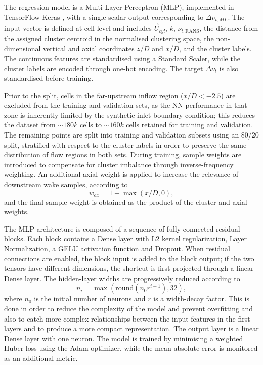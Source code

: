 The regression model is a Multi-Layer Perceptron (MLP), implemented in TensorFlow-Keras \cite{tensorflow2015-whitepaper}, with a single scalar output corresponding to $\Delta \nu_{t,ML}$. The input vector is defined at cell level and includes $\vec{U}_{cyl}$, $k$, $\nu_{t,\mathrm{RANS}}$, the distance from the assigned cluster centroid in the normalised clustering space, the non-dimensional vertical and axial coordinates $z/D$ and $x/D$, and the cluster labels. The continuous features are standardised using a Standard Scaler, while the cluster labels are encoded through one-hot encoding. The target $\Delta \nu_t$ is also standardised before training.

Prior to the split, cells in the far-upstream inflow region ($x/D < -2.5$) are excluded from the training and validation sets, as the NN performance in that zone is inherently limited by the synthetic inlet boundary condition; this reduces the dataset from $\sim 180k$ cells to $\sim 160k$ cells retained for training and validation. The remaining points are split into training and validation subsets using an 80/20 split, stratified with respect to the cluster labels in order to preserve the same distribution of flow regions in both sets. During training, sample weights are introduced to compensate for cluster imbalance through inverse-frequency weighting. An additional axial weight is applied to increase the relevance of downstream wake samples, according to
\begin{equation}
    w_{ax} = 1 + \max(x/D,0),
\end{equation}
and the final sample weight is obtained as the product of the cluster and axial weights.

The MLP architecture is composed of a sequence of fully connected residual blocks. Each block contains a Dense layer with L2 kernel regularization, Layer Normalization, a GELU activation function and Dropout. When residual connections are enabled, the block input is added to the block output; if the two tensors have different dimensions, the shortcut is first projected through a linear Dense layer. The hidden-layer widths are progressively reduced according to
\begin{equation}
    n_i = \max \left( \mathrm{round}(n_0 r^{i-1}), 32 \right),
\end{equation}
where $n_0$ is the initial number of neurons and $r$ is a width-decay factor. This is done in order to reduce the complexity of the model and prevent overfitting and also to catch more complex relationships between the input features in the first layers and to produce a more compact representation. The output layer is a linear Dense layer with one neuron. The model is trained by minimising a weighted Huber loss using the Adam optimizer, while the mean absolute error is monitored as an additional metric.

